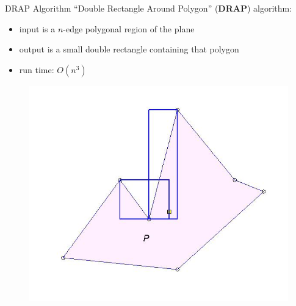 \begin{frame}{DRAP Algorithm}
  ``Double Rectangle Around Polygon'' (\textbf{DRAP}) algorithm:\\
  \begin{itemize}
  \item input is a $n$-edge polygonal region of the plane
  \item output is a small double rectangle containing that polygon
  \item run time: $O(n^3)$
  \end{itemize}
  \begin{figure}
    \includegraphics[scale=0.3]{figs/drap2.jpg}
  \end{figure} 
\end{frame}


